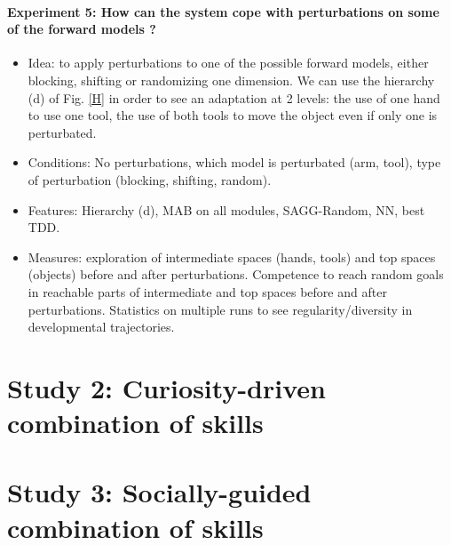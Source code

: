 \documentclass[12pt]{article}
\begin{document}
				\paragraph{Experiment 5: How can the system cope with perturbations on some of the forward models ?}
				\begin{itemize}
					\item Idea: to apply perturbations to one of the possible forward models, either blocking, shifting or randomizing one dimension. 
							We can use the hierarchy (d) of Fig. \ref{H} in order to see an adaptation at 2 levels: the use of one hand to use one tool, the use of both tools to move the object even if only one is perturbated.
					
					\item Conditions: No perturbations, which model is perturbated (arm, tool), type of perturbation (blocking, shifting, random).
					
					\item Features: Hierarchy (d), MAB on all modules, SAGG-Random, NN, best TDD.
					
					\item Measures: exploration of intermediate spaces (hands, tools) and top spaces (objects) before and after perturbations. 
							Competence to reach random goals in reachable parts of intermediate and top spaces before and after perturbations. 
							Statistics on multiple runs to see regularity/diversity in developmental trajectories.
				\end{itemize}

	
	
%


\section{Study 2: Curiosity-driven combination of skills}
\label{study2}


%


\section{Study 3: Socially-guided combination of skills}
\label{study3}

%



\small


\end{document}
